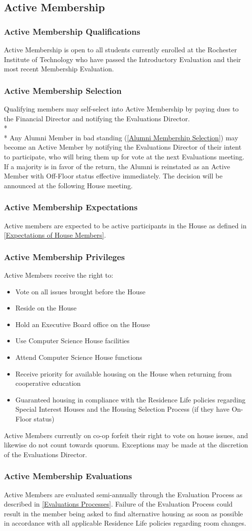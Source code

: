 \documentclass{article}
\newcommand{\asection}[1]{\subsection{#1} \label{#1}}
\newcommand{\asubsection}[1]{\subsubsection{#1} \label{#1}}
\begin{document}
\asection{Active Membership}
\asubsection{Active Membership Qualifications}
Active Membership is open to all students currently enrolled at the Rochester Institute of Technology who have passed the Introductory Evaluation and their most recent Membership Evaluation.
\asubsection{Active Membership Selection}
Qualifying members may self-select into Active Membership by paying dues to the Financial Director and notifying the Evaluations Director.
\\*\\*
Any Alumni Member in bad standing (\ref{Alumni Membership Selection}) may become an Active Member by notifying the Evaluations Director of their intent to participate, who will bring them up for vote at the next Evaluations meeting.
If a majority is in favor of the return, the Alumni is reinstated as an Active Member with Off-Floor status effective immediately.
The decision will be announced at the following House meeting.
\asubsection{Active Membership Expectations}
Active members are expected to be active participants in the House as defined in \ref{Expectations of House Members}.
\asubsection{Active Membership Privileges}
Active Members receive the right to:
\begin{itemize}
	\item Vote on all issues brought before the House
	\item Reside on the House
	\item Hold an Executive Board office on the House
	\item Use Computer Science House facilities
	\item Attend Computer Science House functions
	\item Receive priority for available housing on the House when returning from cooperative education
	\item Guaranteed housing in compliance with the Residence Life policies regarding Special Interest Houses and the Housing Selection Process (if they have On-Floor status)
\end{itemize}
Active Members currently on co-op forfeit their right to vote on house issues, and likewise do not count towards quorum.
Exceptions may be made at the discretion of the Evaluations Director.
\asubsection{Active Membership Evaluations}
Active Members are evaluated semi-annually through the Evaluation Process as described in \ref{Evaluations Processes}.
Failure of the Evaluation Process could result in the member being asked to find alternative housing as soon as possible in accordance with all applicable Residence Life policies regarding room changes.
\end{document}
